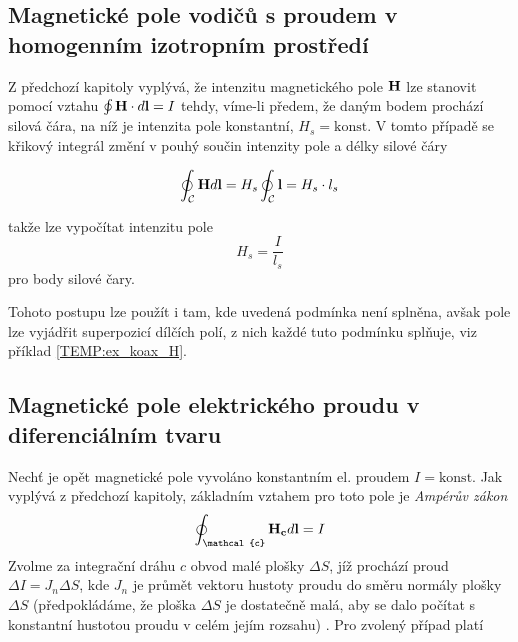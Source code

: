     \subsection{Magnetické pole vodičů s proudem v homogen\-ním izo\-trop\-ním prostředí}
      Z předchozí kapitoly vyplývá, že intenzitu magnetického pole $\mathbf{H}$ lze stanovit pomocí
      vztahu $\oint\mathbf{H}\cdot d\mathbf{l} = I$ tehdy, víme-li předem, že daným bodem prochází silová
      čára, na níž je intenzita pole konstantní, $H_s = \text{konst}$. V tomto případě se křikový
      integrál změní v pouhý součin intenzity pole a délky silové čáry
       
       \begin{equation}\label{TEMP:eq_1MR_v_hom_p}
         \oint_{\mathcal{C}}\mathbf{H}d\mathbf{l} = H_s\oint_{\mathcal{C}}\mathbf{l} = H_s\cdot l_s
       \end{equation}      
       
      takže lze vypočítat intenzitu pole $$H_s = \frac{I}{l_s}$$ pro body silové čary. 
      
      Tohoto postupu lze použít i tam, kde uvedená podmínka není splněna, avšak pole lze vyjádřit
      superpozicí dílčích polí, z nich každé tuto podmínku splňuje, viz příklad 
      \ref{TEMP:ex_koax_H}. 

        

        

    \subsection{Magnetické pole elektrického proudu v diferenciálním tvaru}
      Nechť je opět magnetické pole vyvoláno konstantním el. proudem $I = \text{konst}$. Jak
      vyplývá z předchozí kapitoly, základním vztahem pro toto pole je \emph{Ampérův zákon}
      $$\oint_{\mathcal{c}}\vr{H_c}d\vr{l} = I$$  Zvolme za integrační dráhu $c$ obvod malé plošky
      $\Delta S$, jíž prochází proud $\Delta I = J_n \Delta S$, kde $J_n$ je průmět vektoru hustoty
      proudu do směru normály plošky $\Delta S$ (předpokládáme, že ploška $\Delta S$ je dostatečně
      malá, aby se dalo počítat s konstantní hustotou proudu v celém jejím rozsahu)
      \cite[s.~13]{Trnka1972}. Pro zvolený případ platí
      

